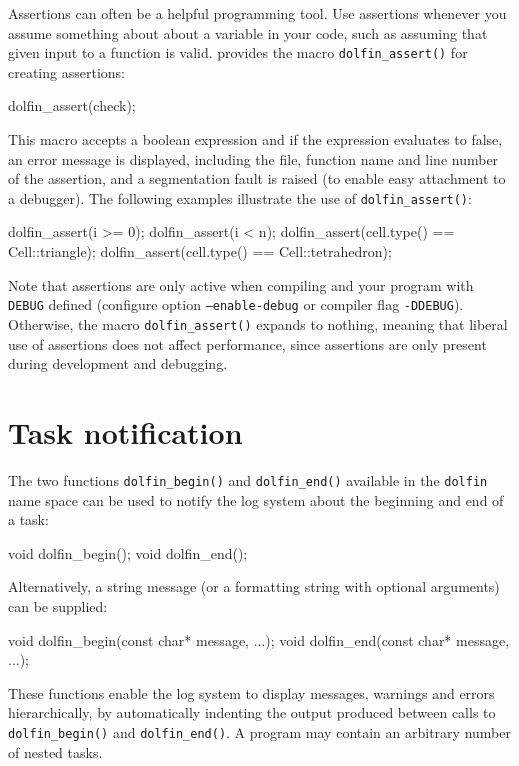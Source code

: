 Assertions can often be a helpful programming tool. Use assertions
whenever you assume something about about a variable in your code,
such as assuming that given input to a function is valid. \dolfin{}
provides the macro \texttt{dolfin\_assert()} for creating assertions:
\begin{code}
dolfin_assert(check);
\end{code}
This macro accepts a boolean expression and if the expression
evaluates to false, an error message is displayed, including the
file, function name and line number of the assertion, and a
segmentation fault is raised (to enable easy attachment to a
debugger). The following examples illustrate the use of
\texttt{dolfin\_assert()}:
\begin{code}
dolfin_assert(i >= 0);
dolfin_assert(i < n);
dolfin_assert(cell.type() == Cell::triangle);
dolfin_assert(cell.type() == Cell::tetrahedron);
\end{code}
Note that assertions are only active when compiling
\dolfin{} and your program with \texttt{DEBUG} defined (configure
option \texttt{--enable-debug} or compiler flag \texttt{-DDEBUG}).
Otherwise, the macro \texttt{dolfin\_assert()} expands to nothing,
meaning that liberal use of assertions does not affect performance,
since assertions are only present during development and
debugging.

\section{Task notification}

The two functions \texttt{dolfin\_begin()} and \texttt{dolfin\_end()}
available in the \texttt{dolfin} name space can be used to notify the
\dolfin{} log system about the beginning and end of a task:
\begin{code}
void dolfin_begin();
void dolfin_end();
\end{code}
Alternatively, a string message (or a formatting string with optional
arguments) can be supplied:
\begin{code}
void dolfin_begin(const char* message, ...);
void dolfin_end(const char* message, ...);
\end{code}

These functions enable the \dolfin{} log system to display messages,
warnings and errors hierarchically, by automatically indenting the
output produced between calls to \texttt{dolfin\_begin()} and
\texttt{dolfin\_end()}. A program may contain an arbitrary number of
nested tasks.

